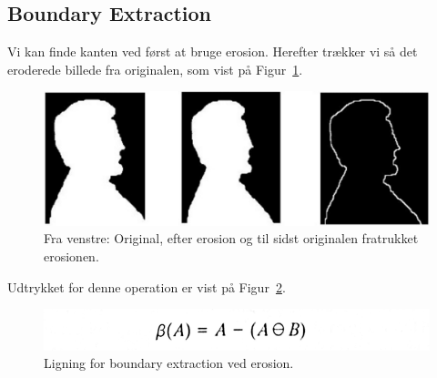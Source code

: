 \subsection{Boundary Extraction}

Vi kan finde kanten ved først at bruge erosion. Herefter trækker vi så det eroderede billede fra originalen, som vist på Figur~\ref{fig:boundary-extraction-by-erosion}.

\begin{figure}[H]
	\centering
	\includegraphics[width=0.9\linewidth]{figs/spm03/boundary-extraction-by-erosion}
	\caption{Fra venstre: Original, efter erosion og til sidst originalen fratrukket erosionen.}
	\label{fig:boundary-extraction-by-erosion}
\end{figure}

Udtrykket for denne operation er vist på Figur~\ref{fig:edgedetektioneq}. 

\begin{figure}[H]
	\centering
	\includegraphics[width=0.55\linewidth]{figs/spm03/edgedetektioneq}
	\caption{Ligning for boundary extraction ved erosion.}
	\label{fig:edgedetektioneq}
\end{figure}
